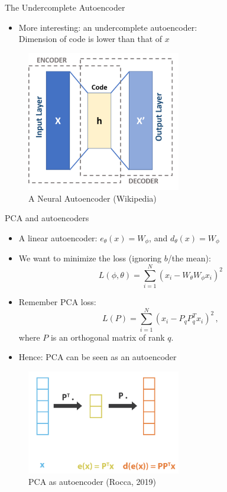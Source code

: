 \documentclass[10pt]{beamer}
\begin{document}
\begin{frame}{The Undercomplete Autoencoder}

\begin{itemize}
\item More interesting: an {\color{uured}undercomplete} autoencoder:\\Dimension of code is {\color{uured}lower} than that of $x$
\end{itemize}

\begin{figure}[h]
\centering
\includegraphics[width=0.6\textwidth]{fig/440px-Autoencoder_schema.png}
\caption{A Neural Autoencoder (Wikipedia)}
\end{figure}

\end{frame}


\begin{frame}{PCA and autoencoders}

\begin{itemize}
\item A linear autoencoder: $e_\theta(x) = W_\phi$, and $d_\theta(x) = W_\phi$
\item We want to minimize the loss (ignoring $b$/the mean):
\[
L(\phi, \theta) = \sum_{i=1}^N (x_i - W_\theta W_\phi x_i)^2
\]
\pause
\item Remember {\color{uured} PCA loss}:
\[
L(P) = \sum_{i=1}^N (x_i - P_q P_q^T x_i)^2\,,
\]
where $P$ is an orthogonal matrix of rank $q$.
\pause
\item {\color{uured} Hence}: PCA can be seen as an autoencoder
\end{itemize}

\begin{figure}[h]
\centering
\includegraphics[width=0.6\textwidth]{fig/Rocca_PCA_as_autoencoder2.png}
\caption{PCA as autoencoder (Rocca, 2019)}
\end{figure}

\end{frame}
\end{document}
